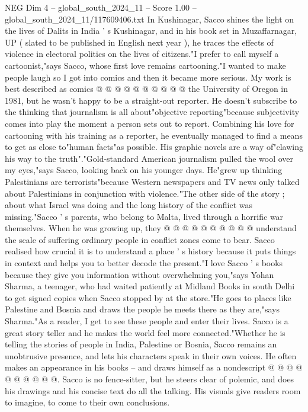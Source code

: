\begin{textsample}{NEG Dim 4 – global\_south\_2024\_11 – Score 1.00 – global\_south\_2024\_11/117609406.txt}
In Kushinagar, Sacco shines the light on the lives of Dalits in India ' s Kushinagar, and in his book set in Muzaffarnagar, UP ( slated to be published in English next year ), he traces the effects of violence in electoral politics on the lives of citizens."I prefer to call myself a cartoonist,"says Sacco, whose first love remains cartooning."I wanted to make people laugh so I got into comics and then it became more serious.
My work is best described as comics @ @ @ @ @ @ @ @ @ @ the University of Oregon in 1981, but he wasn't happy to be a straight-out reporter.
He doesn't subscribe to the thinking that journalism is all about"objective reporting"because subjectivity comes into play the moment a person sets out to report.
Combining his love for cartooning with his training as a reporter, he eventually managed to find a means to get as close to"human facts"as possible.
His graphic novels are a way of"clawing his way to the truth"."Gold-standard American journalism pulled the wool over my eyes,"says Sacco, looking back on his younger days.
He"grew up thinking Palestinians are terrorists"because Western newspapers and TV news only talked about Palestinians in conjunction with violence."The other side of the story ; about what Israel was doing and the long history of the conflict was missing."Sacco ' s parents, who belong to Malta, lived through a horrific war themselves.
When he was growing up, they @ @ @ @ @ @ @ @ @ @ understand the scale of suffering ordinary people in conflict zones come to bear.
Sacco realised how crucial it is to understand a place ' s history because it puts things in context and helps you to better decode the present."I love Sacco ' s books because they give you information without overwhelming you,"says Yohan Sharma, a teenager, who had waited patiently at Midland Books in south Delhi to get signed copies when Sacco stopped by at the store."He goes to places like Palestine and Bosnia and draws the people he meets there as they are,"says Sharma."As a reader, I get to see these people and enter their lives.
Sacco is a great story teller and he makes the world feel more connected."Whether he is telling the stories of people in India, Palestine or Bosnia, Sacco remains an unobtrusive presence, and lets his characters speak in their own voices.
He often makes an appearance in his books -- and draws himself as a nondescript @ @ @ @ @ @ @ @ @ @.
Sacco is no fence-sitter, but he steers clear of polemic, and does his drawings and his concise text do all the talking.
His visuals give readers room to imagine, to come to their own conclusions.

\end{textsample}

